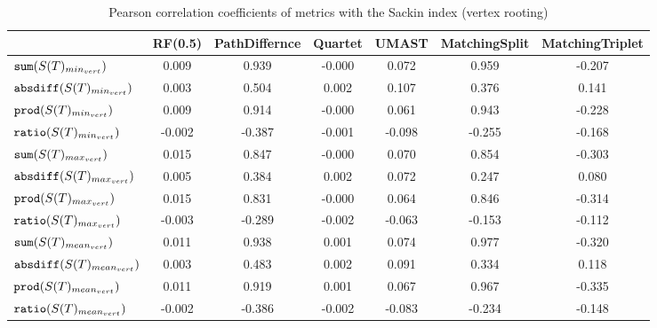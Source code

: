 \begin{table}[h]
\centering
\caption{Pearson correlation coefficients of metrics with the Sackin index (vertex rooting)}
\begin{tabular}{lcccccc}
 & RF(0.5) & PathDiffernce & Quartet & UMAST & MatchingSplit & MatchingTriplet \\
\hline
${\verb+sum+}(S(T)_{min_{vert}})$ & 0.009 & 0.939 & -0.000 & 0.072 & 0.959 & -0.207 \\
${\verb+absdiff+}(S(T)_{min_{vert}})$ & 0.003 & 0.504 & 0.002 & 0.107 & 0.376 & 0.141 \\
${\verb+prod+}(S(T)_{min_{vert}})$ & 0.009 & 0.914 & -0.000 & 0.061 & 0.943 & -0.228 \\
${\verb+ratio+}(S(T)_{min_{vert}})$ & -0.002 & -0.387 & -0.001 & -0.098 & -0.255 & -0.168 \\
${\verb+sum+}(S(T)_{max_{vert}})$ & 0.015 & 0.847 & -0.000 & 0.070 & 0.854 & -0.303 \\
${\verb+absdiff+}(S(T)_{max_{vert}})$ & 0.005 & 0.384 & 0.002 & 0.072 & 0.247 & 0.080 \\
${\verb+prod+}(S(T)_{max_{vert}})$ & 0.015 & 0.831 & -0.000 & 0.064 & 0.846 & -0.314 \\
${\verb+ratio+}(S(T)_{max_{vert}})$ & -0.003 & -0.289 & -0.002 & -0.063 & -0.153 & -0.112 \\
${\verb+sum+}(S(T)_{mean_{vert}})$ & 0.011 & 0.938 & 0.001 & 0.074 & 0.977 & -0.320 \\
${\verb+absdiff+}(S(T)_{mean_{vert}})$ & 0.003 & 0.483 & 0.002 & 0.091 & 0.334 & 0.118 \\
${\verb+prod+}(S(T)_{mean_{vert}})$ & 0.011 & 0.919 & 0.001 & 0.067 & 0.967 & -0.335 \\
${\verb+ratio+}(S(T)_{mean_{vert}})$ & -0.002 & -0.386 & -0.002 & -0.083 & -0.234 & -0.148 \\
\end{tabular}
\end{table}

